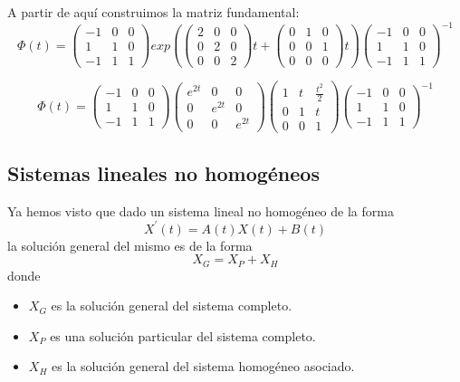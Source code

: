 \documentclass{mathnotes}
\begin{document}
\begin{example}
A partir de aquí construimos la matriz fundamental:
$$\Phi(t) = \begin{pmatrix}
-1 & 0 & 0\\ 1 & 1 & 0\\-1& 1& 1
\end{pmatrix}exp(\begin{pmatrix}
2 & 0 & 0\\ 0 & 2 & 0\\0& 0& 2
\end{pmatrix}t+\begin{pmatrix}
0 & 1 & 0\\ 0 & 0 & 1\\0& 0& 0
\end{pmatrix}t)\begin{pmatrix}
-1 & 0 & 0\\ 1 & 1 & 0\\-1& 1& 1
\end{pmatrix}^{-1}$$

$$\Phi(t) = \begin{pmatrix}
-1 & 0 & 0\\ 1 & 1 & 0\\-1& 1& 1
\end{pmatrix}\begin{pmatrix}
e^{2t} & 0 & 0\\ 0 & e^{2t} & 0\\0& 0& e^{2t}
\end{pmatrix}\begin{pmatrix}
1 & t & \frac{t^2}{2}\\ 0 & 1 & t\\ 0 & 0 & 1
\end{pmatrix}\begin{pmatrix}
-1 & 0 & 0\\ 1 & 1 & 0\\-1& 1& 1
\end{pmatrix}^{-1}$$

\end{example}

\subsection{Sistemas lineales no homogéneos}
Ya hemos visto que dado un sistema lineal no homogéneo de la forma $$X^\prime(t) = A(t)X(t)+B(t)$$ la solución general del mismo es de la forma $$X_G = X_P + X_H$$ donde \begin{itemize}
\item $X_G$ es la solución general del sistema completo.

\item $X_P$ es una solución particular del sistema completo.

\item $X_H$ es la solución general del sistema homogéneo asociado.
\end{itemize}
\end{document}
